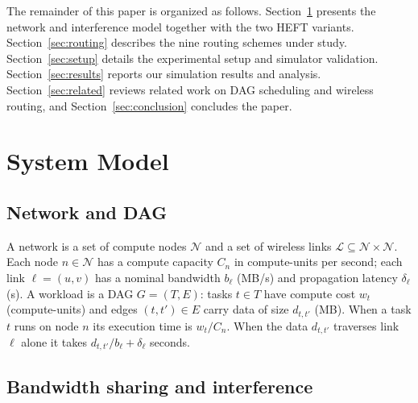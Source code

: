 \documentclass[conference]{IEEEtran}
\begin{document}
The remainder of this paper is organized as follows.
Section~\ref{sec:model} presents the network and interference model
together with the two HEFT variants. Section~\ref{sec:routing} describes
the nine routing schemes under study. Section~\ref{sec:setup} details the
experimental setup and simulator validation. Section~\ref{sec:results}
reports our simulation results and analysis. Section~\ref{sec:related}
reviews related work on DAG scheduling and wireless routing, and
Section~\ref{sec:conclusion} concludes the paper.

\section{System Model}
\label{sec:model}

\subsection{Network and DAG}

A network is a set of compute nodes $\mathcal{N}$ and a set of wireless links
$\mathcal{L}\subseteq\mathcal{N}\times\mathcal{N}$. Each node $n\in\mathcal{N}$
has a compute capacity $C_n$ in compute-units per second; each link
$\ell=(u,v)$ has a nominal bandwidth $b_\ell$ (MB/s) and propagation latency
$\delta_\ell$ (s). A workload is a DAG $G=(T,E)$: tasks $t\in T$ have compute
cost $w_t$ (compute-units) and edges $(t,t')\in E$ carry data of size
$d_{t,t'}$ (MB). When a task $t$ runs on node $n$ its execution time is
$w_t/C_n$. When the data $d_{t,t'}$ traverses link $\ell$ alone it takes
$d_{t,t'}/b_\ell + \delta_\ell$ seconds.

\subsection{Bandwidth sharing and interference}
\end{document}
